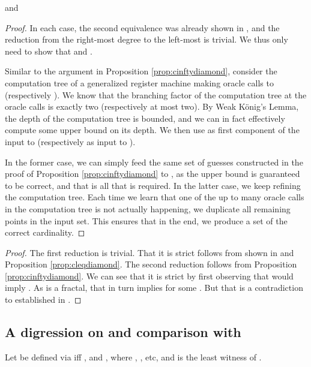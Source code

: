 \documentclass{eptcs-modified}
\begin{document}
\begin{proposition}
\label{prop:cleqdiamond}

and

\begin{proof}
In each case, the second equivalence was already shown in \cite{paulyleroux}, and the reduction from the right-most degree to the left-most is trivial. We thus only need to show that  and .

Similar to the argument in Proposition \ref{prop:cinftydiamond}, consider the computation tree of a generalized register machine  making oracle calls to  (respectively ). We know that the branching factor of the computation tree at the oracle calls is exactly two (respectively at most two). By Weak K\"onig's Lemma, the depth of the computation tree is bounded, and we can in fact effectively compute some upper bound  on its depth. We then use  as first component of the input to  (respectively  as input to ).

In the former case, we can simply feed the same set of guesses constructed in the proof of Proposition \ref{prop:cinftydiamond} to , as the upper bound is guaranteed to be correct, and that is all that is required. In the latter case, we keep refining the computation tree. Each time we learn that one of the up to  many oracle calls in the computation tree is not actually happening, we duplicate all remaining points in the input set. This ensures that in the end, we produce a set of the correct cardinality.
\end{proof}
\end{proposition}

\begin{corollary}

\begin{proof}
The first reduction is trivial. That it is strict follows from  shown in \cite{paulyleroux} and Proposition \ref{prop:cleqdiamond}. The second reduction follows from Proposition \ref{prop:cinftydiamond}. We can see that it is strict by first observing that  would imply . As  is a fractal, that in turn implies  for some . But that is a contradiction to  established in \cite{paulyleroux}.
\end{proof}
\end{corollary}
\subsection{A digression on and comparison with }
\begin{definition}
Let  be defined via  iff , and , where , , etc, and  is the least witness of .
\end{definition}
\end{document}

